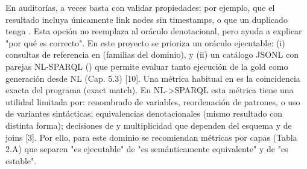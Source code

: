 \markdownRendererUlItem {} En auditorías, a veces basta con validar propiedades: por ejemplo, que el resultado incluya únicamente link nodes sin timestamps, o que un duplicado tenga . Esta opción no reemplaza al oráculo denotacional, pero ayuda a explicar "por qué es correcto".\markdownRendererUlItemEnd 
\markdownRendererUlEndTight \markdownRendererInterblockSeparator
{}En este proyecto se prioriza un oráculo ejecutable: (i) consultas de referencia en  (familias del dominio), y (ii) un catálogo JSONL con parejas NL-SPARQL () que permite evaluar tanto ejecución de la gold como generación desde NL (Cap. 5.3) [10].\markdownRendererInterblockSeparator
{}\markdownRendererInterblockSeparator
{}Una métrica habitual en  es la coincidencia exacta del programa (exact match). En NL->SPARQL esta métrica tiene una utilidad limitada por:\markdownRendererInterblockSeparator
{}\markdownRendererUlBeginTight
\markdownRendererUlItem renombrado de variables, reordenación de patrones, o uso de variantes sintácticas;\markdownRendererUlItemEnd 
\markdownRendererUlItem equivalencias denotacionales (mismo resultado con distinta forma);\markdownRendererUlItemEnd 
\markdownRendererUlItem decisiones de  y multiplicidad que dependen del esquema y de joins [3].\markdownRendererUlItemEnd 
\markdownRendererUlEndTight \markdownRendererInterblockSeparator
{}Por ello, para este dominio se recomiendan métricas por capas (Tabla 2.A) que separen "es ejecutable" de "es semánticamente equivalente" y de "es estable".\markdownRendererInterblockSeparator
{}\markdownRendererInterblockSeparator

